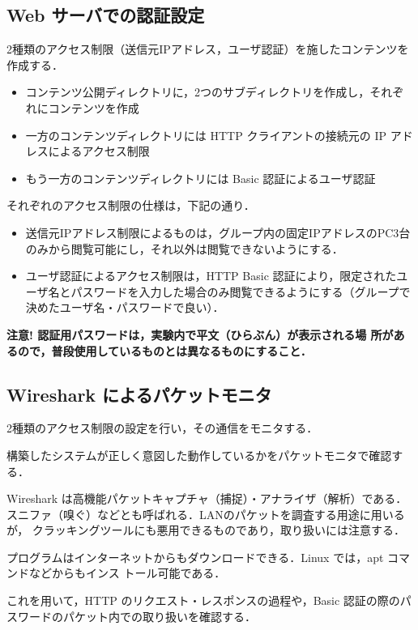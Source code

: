 \subsection*{Web サーバでの認証設定}

2種類のアクセス制限（送信元IPアドレス，ユーザ認証）を施したコンテンツを作成する．

\begin{itemize}
 \item コンテンツ公開ディレクトリに，2つのサブディレクトリを作成し，それぞれにコンテンツを作成
 \item 一方のコンテンツディレクトリには HTTP クライアントの接続元の IP アドレスによるアクセス制限
 \item もう一方のコンテンツディレクトリには Basic 認証によるユーザ認証
\end{itemize}

それぞれのアクセス制限の仕様は，下記の通り．
\begin{itemize}
 \item 送信元IPアドレス制限によるものは，グループ内の固定IPアドレスのPC3台のみから閲覧可能にし，それ以外は閲覧できないようにする．
 \item ユーザ認証によるアクセス制限は，HTTP Basic 認証により，限定されたユーザ名とパスワードを入力した場合のみ閲覧できるようにする（グループで決めたユーザ名・パスワードで良い）．
\end{itemize}



\textbf{注意! 認証用パスワードは，実験内で平文（ひらぶん）が表示される場
所があるので，普段使用しているものとは異なるものにすること．}

\subsection*{Wireshark によるパケットモニタ}

2種類のアクセス制限の設定を行い，その通信をモニタする．

構築したシステムが正しく意図した動作しているかをパケットモニタで確認する．

Wireshark は高機能パケットキャプチャ（捕捉）・アナライザ（解析）である．
スニファ（嗅ぐ）などとも呼ばれる．LANのパケットを調査する用途に用いるが，
クラッキングツールにも悪用できるものであり，取り扱いには注意する．

プログラムはインターネットからもダウンロードできる．Linux では，apt コマンドなどからもインス
トール可能である．

これを用いて，HTTP のリクエスト・レスポンスの過程や，Basic 認証の際のパ
スワードのパケット内での取り扱いを確認する．

